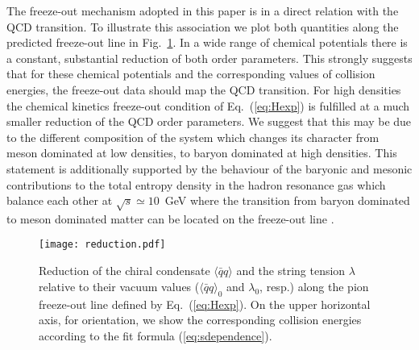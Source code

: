 \documentclass[12pt]{article}
\begin{document}
The freeze-out mechanism adopted in this paper is in  a direct relation with the QCD transition. 
To illustrate this association we plot both quantities along the predicted freeze-out line in 
Fig.~\ref{fig:Reduction}. 
In a wide range of chemical potentials there is a constant, substantial reduction of both order parameters. This strongly suggests that for these chemical potentials and the corresponding values of collision
energies, the freeze-out data should map the QCD transition.
For high densities the chemical kinetics freeze-out condition of Eq.~(\ref{eq:Hexp}) is fulfilled at a much smaller reduction of the QCD order parameters. 
We suggest that this may be due to the different composition of the system which changes its character
from meson dominated at low densities, to baryon dominated at high densities. 
This statement is additionally supported by the behaviour of the baryonic and mesonic contributions to the total entropy density in the hadron resonance gas \cite{Andronic:2009gj} which balance each other at 
$\sqrt{s}\simeq10$~GeV where the transition from baryon dominated to meson dominated matter can be located on the freeze-out line \cite{Andronic:2009gj}.


\begin{figure}[h]
	\begin{center}
	\texttt{[image: reduction.pdf]}
	\caption{Reduction of the chiral condensate $\langle \bar{q} q\rangle$ and the string tension
	 $\lambda$ relative to their vacuum values ($\langle \bar{q} q\rangle_0$ and $\lambda_0$, resp.) 
	 along the pion freeze-out line defined by Eq.~(\ref{eq:Hexp}). On the upper horizontal
	axis, for orientation, we show the corresponding collision energies according to the fit formula 
	 (\ref{eq:sdependence}).
	}
	\label{fig:Reduction}
	\end{center}
\end{figure}

\end{document}
